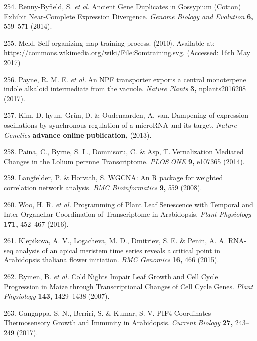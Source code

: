 \documentclass[12pt,]{book}
\begin{document}
\hypertarget{ref-renny_byfield_ancient_2014}{}
254. Renny-Byfield, S. \emph{et al.} Ancient Gene Duplicates in
Gossypium (Cotton) Exhibit Near-Complete Expression Divergence.
\emph{Genome Biology and Evolution} \textbf{6,} 559--571 (2014).

\hypertarget{ref-som_explanation}{}
255. Mcld. Self-organizing map training process. (2010). Available at:
\url{https://commons.wikimedia.org/wiki/File:Somtraining.svg}.
(Accessed: 16th May 2017)

\hypertarget{ref-payne_npf_2017}{}
256. Payne, R. M. E. \emph{et al.} An NPF transporter exports a central
monoterpene indole alkaloid intermediate from the vacuole. \emph{Nature
Plants} \textbf{3,} nplants2016208 (2017).

\hypertarget{ref-kim_dampening_2013}{}
257. Kim, D. hyun, Grün, D. \& Oudenaarden, A. van. Dampening of
expression oscillations by synchronous regulation of a microRNA and its
target. \emph{Nature Genetics} \textbf{advance online publication,}
(2013).

\hypertarget{ref-paina_vernalization_2014}{}
258. Paina, C., Byrne, S. L., Domnisoru, C. \& Asp, T. Vernalization
Mediated Changes in the Lolium perenne Transcriptome. \emph{PLOS ONE}
\textbf{9,} e107365 (2014).

\hypertarget{ref-langfelder_wgcna_2008}{}
259. Langfelder, P. \& Horvath, S. WGCNA: An R package for weighted
correlation network analysis. \emph{BMC Bioinformatics} \textbf{9,} 559
(2008).

\hypertarget{ref-woo_programming_2016}{}
260. Woo, H. R. \emph{et al.} Programming of Plant Leaf Senescence with
Temporal and Inter-Organellar Coordination of Transcriptome in
Arabidopsis. \emph{Plant Physiology} \textbf{171,} 452--467 (2016).

\hypertarget{ref-klepikova_rnaseq_2015}{}
261. Klepikova, A. V., Logacheva, M. D., Dmitriev, S. E. \& Penin, A. A.
RNA-seq analysis of an apical meristem time series reveals a critical
point in Arabidopsis thaliana flower initiation. \emph{BMC Genomics}
\textbf{16,} 466 (2015).

\hypertarget{ref-rymen_cold_2007}{}
262. Rymen, B. \emph{et al.} Cold Nights Impair Leaf Growth and Cell
Cycle Progression in Maize through Transcriptional Changes of Cell Cycle
Genes. \emph{Plant Physiology} \textbf{143,} 1429--1438 (2007).

\hypertarget{ref-gangappa_pif4_2017}{}
263. Gangappa, S. N., Berriri, S. \& Kumar, S. V. PIF4 Coordinates
Thermosensory Growth and Immunity in Arabidopsis. \emph{Current Biology}
\textbf{27,} 243--249 (2017).
\end{document}
